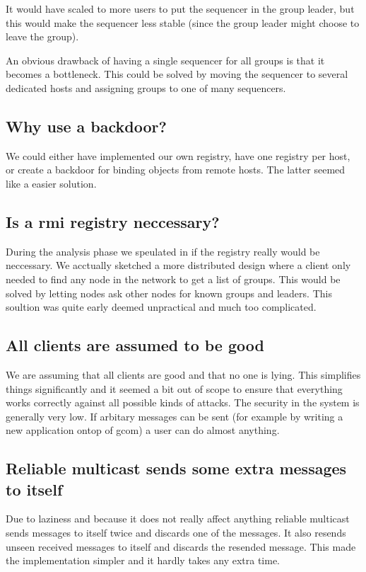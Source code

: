 \documentclass[a4paper,english]{article}
\begin{document}
It would have scaled to more users to put the sequencer in the group leader, but this would make the sequencer less stable (since the group leader might choose to leave the group).

An obvious drawback of having a single sequencer for all groups is that it becomes a bottleneck. This could be solved by moving the sequencer to several dedicated hosts and assigning groups to one of many sequencers.

\subsection{Why use a backdoor?}
We could either have implemented our own registry, have one registry per host, or create a backdoor for binding objects from remote hosts. The latter seemed like a easier solution.

\subsection{Is a rmi registry neccessary?}
During the analysis phase we speulated in if the registry really would be neccessary. We acctually sketched a more distributed design where a client only needed to find any node in the network to get a list of groups. This would be solved by letting nodes ask other nodes for known groups and leaders. This soultion was quite early deemed unpractical and much too complicated.

\subsection{All clients are assumed to be good}
We are assuming that all clients are good and that no one is lying. This simplifies things significantly and it seemed a bit out of scope to ensure that everything works correctly against all possible kinds of attacks. The security in the system is generally very low. If arbitary messages can be sent (for example by writing a new application ontop of gcom) a user can do almost anything.

\subsection{Reliable multicast sends some extra messages to itself}
Due to laziness and because it does not really affect anything reliable multicast sends messages to itself twice and discards one of the messages. It also resends unseen received messages to itself and discards the resended message. This made the implementation simpler and it hardly takes any extra time.
\end{document}
